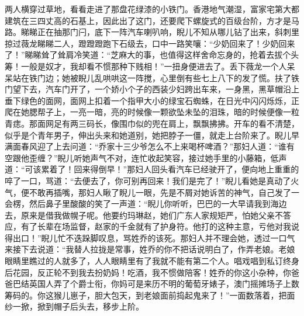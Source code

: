 \par 两人横穿过草地，看看走进了那盘花绿漆的小铁门。香港地气潮湿，富家宅第大都建筑在三四丈高的石基上，因此出了这门，还要爬下螺旋式的百级台阶，方才是马路。睇睇正在抽那门闩，底下一阵汽车喇叭响，睨儿不知从哪儿钻了出来，斜刺里掠过薇龙睇睇二人，蹬蹬蹬跑下石级去，口中一路笑嚷：“少奶回来了！少奶回来了！”睇睇耸了耸肩冷笑道：“芝麻大的事，也值得这样舍命忘身的，抢着去拔个头筹！一般是奴才，我却看不惯那种下贱相！”一扭身便进去了。丢下薇龙一个人呆呆站在铁门边；她被睨儿乱哄哄这一阵搅，心里倒有些七上八下的发了慌。扶了铁门望下去，汽车门开了，一个娇小个子的西装少妇跨出车来，一身黑，黑草帽沿上垂下绿色的面网，面网上扣着一个指甲大小的绿宝石蜘蛛，在日光中闪闪烁烁，正爬在她腮帮子上，一亮一暗，亮的时候像一颗欲坠未坠的泪珠，暗的时候便像一粒青痣。那面网足有两三码长，像围巾似的兜在肩上，飘飘拂拂。开车的看不清楚，似乎是个青年男子，伸出头来和她道别，她把脖子一僵，就走上台阶来了。睨儿早满面春风迎了上去问道：“乔家十三少爷怎么不上来喝杯啤酒？”那妇人道：“谁有空跟他歪缠？”睨儿听她声气不对，连忙收起笑容，接过她手里的小藤箱，低声道：“可该累着了！回来得倒早！”那妇人回头看汽车已经驶开了，便向地上重重的啐了一口，骂道：“去便去了，你可别再回来！我们是完了！”睨儿看她是真动了火气，便不敢再插嘴，那妇人瞅了睨儿一眼，先是不屑对她诉苦的神气，自己发了一会楞，然后鼻子里酸酸的笑了一声道：“睨儿你听听，巴巴的一大早请我到海边去，原来是借我做幌子呢。他要约玛琳赵，她们广东人家规矩严，怕她父亲不答应，有了长辈在场监督，赵家的千金就有了护身符。他打的这种主意，亏他对我说得出口！”睨儿忙不迭跺脚叹息，骂姓乔的该死。那妇人并不理会她，透过一口气来接下去说道：“我替人拉拢是常事，姓乔的你不把话说明白了，作弄老娘。老娘眼睛里瞧过的人就多了，人人眼睛里有了我就不能有第二个人。唱戏唱到私订终身后花园，反正轮不到我去扮奶妈！吃酒，我不惯做陪客！姓乔的你这小杂种，你爸爸巴结英国人弄了个爵士衔，你妈可是来历不明的葡萄牙婊子，澳门摇摊场子上数筹码的。你这猴儿崽子，胆大包天，到老娘面前捣起鬼来了！”一面数落着，把面纱一掀，掀到帽子后头去，移步上阶。
